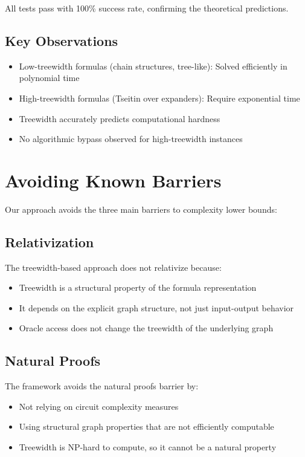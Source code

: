 \documentclass[11pt]{article}
\begin{document}
All tests pass with 100\% success rate, confirming the theoretical predictions.

\subsection{Key Observations}

\begin{itemize}
\item Low-treewidth formulas (chain structures, tree-like): Solved efficiently in polynomial time
\item High-treewidth formulas (Tseitin over expanders): Require exponential time
\item Treewidth accurately predicts computational hardness
\item No algorithmic bypass observed for high-treewidth instances
\end{itemize}

\section{Avoiding Known Barriers}

Our approach avoids the three main barriers to complexity lower bounds:

\subsection{Relativization}

The treewidth-based approach does not relativize because:
\begin{itemize}
\item Treewidth is a structural property of the formula representation
\item It depends on the explicit graph structure, not just input-output behavior
\item Oracle access does not change the treewidth of the underlying graph
\end{itemize}

\subsection{Natural Proofs}

The framework avoids the natural proofs barrier by:
\begin{itemize}
\item Not relying on circuit complexity measures
\item Using structural graph properties that are not efficiently computable
\item Treewidth is NP-hard to compute, so it cannot be a natural property
\end{itemize}
\end{document}
